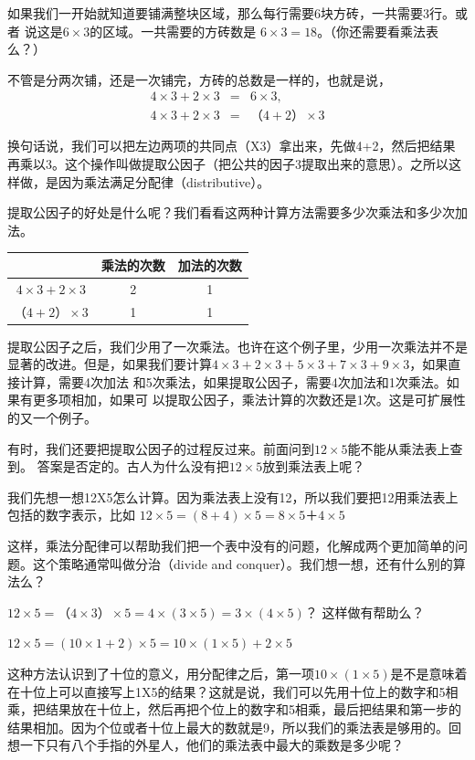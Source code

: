   如果我们一开始就知道要铺满整块区域，那么每行需要6块方砖，一共需要3行。或者	说这是$6\times3$的区域。一共需要的方砖数是
    $6\times3 = 18$。（你还需要看乘法表么？）

  不管是分两次铺，还是一次铺完，方砖的总数是一样的，也就是说，
  \begin{eqnarray}
    4\times3+2\times3 &=& 6\times3,\\
    4\times3+2\times3 &=& （4+2）\times3
  \end{eqnarray}
  
  换句话说，我们可以把左边两项的共同点（X3）拿出来，先做4+2，然后把结果再乘以3。这个操作叫做提取公因子（把公共的因子3提取出来的意思）。之所以这样做，是因为乘法满足分配律（distributive）。

  提取公因子的好处是什么呢？我们看看这两种计算方法需要多少次乘法和多少次加法。
\begin{table}
    \center
    \begin{tabular}{c c c}
  &乘法的次数&加法的次数\\
\hline
    $4\times3+2\times3$&	2&	1\\
    $（4+2）\times3$&	1&	1
    \end{tabular}
\end{table}
    
  提取公因子之后，我们少用了一次乘法。也许在这个例子里，少用一次乘法并不是显著的改进。但是，如果我们要计算$4\times3+2\times3+5\times3+7\times3+9\times3$，如果直接计算，需要4次加法	和5次乘法，如果提取公因子，需要4次加法和1次乘法。如果有更多项相加，如果可	以提取公因子，乘法计算的次数还是1次。这是可扩展性的又一个例子。

  有时，我们还要把提取公因子的过程反过来。前面问到$12\times5$能不能从乘法表上查到。	答案是否定的。古人为什么没有把$12\times5$放到乘法表上呢？
  
  我们先想一想12X5怎么计算。因为乘法表上没有12，所以我们要把12用乘法表上包括的数字表示，比如
   $12\times5 = (8+4)\times5
    = 8\times5＋4\times5$

  这样，乘法分配律可以帮助我们把一个表中没有的问题，化解成两个更加简单的问题。这个策略通常叫做分治（divide and conquer）。我们想一想，还有什么别的算法么？

  $12\times5 = （4\times3）\times5 = 4\times(3\times5)=3\times(4\times5)$？ 这样做有帮助么？

  $12\times5=(10\times1+ 2)\times5
  = 10\times(1\times5) + 2\times5$

  这种方法认识到了十位的意义，用分配律之后，第一项$10\times(1\times5)$是不是意味着在十位上可以直接写上1X5的结果？这就是说，我们可以先用十位上的数字和5相乘，把结果放在十位上，然后再把个位上的数字和5相乘，最后把结果和第一步的结果相加。因为个位或者十位上最大的数就是9，所以我们的乘法表是够用的。回想一下只有八个手指的外星人，他们的乘法表中最大的乘数是多少呢？    

